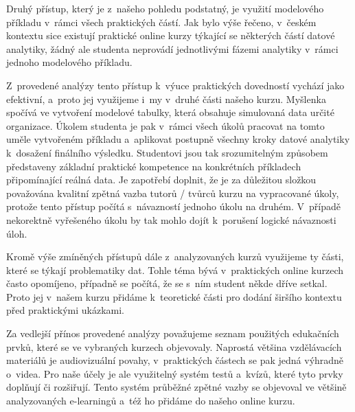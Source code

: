 Druhý přístup, který je z~našeho pohledu podstatný, je využití modelového příkladu v~rámci všech praktických částí. Jak bylo výše řečeno, v~českém kontextu sice existují praktické online kurzy týkající se některých částí datové analytiky, žádný ale studenta neprovádí jednotlivými fázemi analytiky v~rámci jednoho modelového příkladu.

Z~provedené analýzy tento přístup k~výuce praktických dovedností vychází jako efektivní, a~proto jej využijeme i~my v~druhé části našeho kurzu. Myšlenka spočívá ve vytvoření modelové tabulky, která obsahuje simulovaná data určité organizace. Úkolem studenta je pak v~rámci všech úkolů pracovat na tomto uměle vytvořeném příkladu a~aplikovat postupně všechny kroky datové analytiky k~dosažení finálního výsledku. Studentovi jsou tak srozumitelným způsobem představeny základní praktické kompetence na konkrétních příkladech připomínající reálná data. Je zapotřebí doplnit, že je za důležitou složkou považována kvalitní zpětná vazba tutorů / tvůrců kurzu na vypracované úkoly, protože tento přístup počítá s~návazností jednoho úkolu na druhém. V~případě nekorektně vyřešeného úkolu by tak mohlo dojít k~porušení logické návaznosti úloh.

Kromě výše zmíněných přístupů dále z~analyzovaných kurzů využijeme ty části, které se týkají problematiky dat. Tohle téma bývá v~praktických online kurzech často opomíjeno, případně se počítá, že se s~ním student někde dříve setkal. Proto jej v~našem kurzu přidáme k~teoretické části pro dodání širšího kontextu před praktickými ukázkami.

Za vedlejší přínos provedené analýzy považujeme seznam použitých edukačních prvků, které se ve vybraných kurzech objevovaly. Naprostá většina vzdělávacích materiálů je audiovizuální povahy, v~praktických částech se pak jedná výhradně o~videa. Pro naše účely je ale využitelný systém testů a~kvízů, které tyto prvky doplňují či rozšiřují. Tento systém průběžné zpětné vazby se objevoval ve většině analyzovaných e-learningů a~též ho přidáme do našeho online kurzu.
